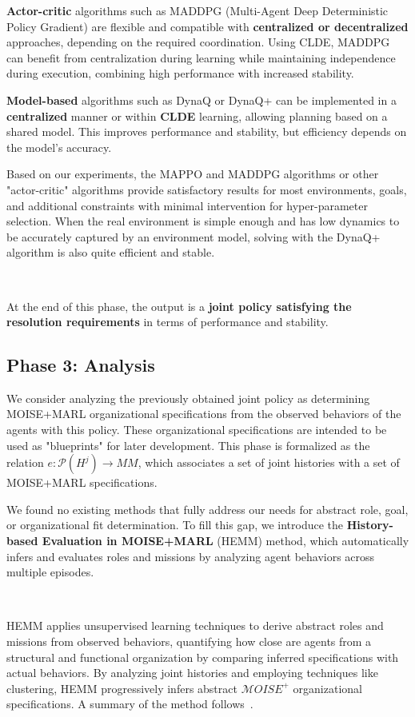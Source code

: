 \documentclass[sigconf,anonymous]{aamas}
\begin{document}
\textbf{Actor-critic} algorithms such as MADDPG (Multi-Agent Deep Deterministic Policy Gradient) are flexible and compatible with \textbf{centralized or decentralized} approaches, depending on the required coordination. Using CLDE, MADDPG can benefit from centralization during learning while maintaining independence during execution, combining high performance with increased stability.

\textbf{Model-based} algorithms such as DynaQ or DynaQ+ can be implemented in a \textbf{centralized} manner or within \textbf{CLDE} learning, allowing planning based on a shared model. This improves performance and stability, but efficiency depends on the model's accuracy.

Based on our experiments, the MAPPO and MADDPG algorithms or other "actor-critic" algorithms provide satisfactory results for most environments, goals, and additional constraints with minimal intervention for hyper-parameter selection. When the real environment is simple enough and has low dynamics to be accurately captured by an environment model, solving with the DynaQ+ algorithm is also quite efficient and stable.

\

At the end of this phase, the output is a \textbf{joint policy satisfying the resolution requirements} in terms of performance and stability.

\subsection{Phase 3: Analysis}

We consider analyzing the previously obtained joint policy as determining MOISE+MARL organizational specifications from the observed behaviors of the agents with this policy. These organizational specifications are intended to be used as "blueprints" for later development. This phase is formalized as the relation $e: \mathcal{P}(H^{j}) \to MM$, which associates a set of joint histories with a set of MOISE+MARL specifications.

We found no existing methods that fully address our needs for abstract role, goal, or organizational fit determination. To fill this gap, we introduce the \textbf{History-based Evaluation in MOISE+MARL} (HEMM) method, which automatically infers and evaluates roles and missions by analyzing agent behaviors across multiple episodes.

\

\noindent HEMM applies unsupervised learning techniques to derive abstract roles and missions from observed behaviors, quantifying how close are agents from a structural and functional organization by comparing inferred specifications with actual behaviors. By analyzing joint histories and employing techniques like clustering, HEMM progressively infers abstract $\mathcal{M}OISE^+$ organizational specifications. A summary of the method follows~\hyperref[fn:github]{\footnotemark[1]}.
%
\end{document}
